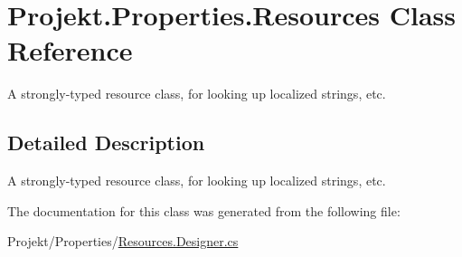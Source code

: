 \hypertarget{class_projekt_1_1_properties_1_1_resources}{}\section{Projekt.\+Properties.\+Resources Class Reference}
\label{class_projekt_1_1_properties_1_1_resources}


A strongly-\/typed resource class, for looking up localized strings, etc.  




\subsection{Detailed Description}
A strongly-\/typed resource class, for looking up localized strings, etc. 



The documentation for this class was generated from the following file\+:\begin{DoxyCompactItemize}
\item 
Projekt/\+Properties/\mbox{\hyperlink{_resources_8_designer_8cs}{Resources.\+Designer.\+cs}}\end{DoxyCompactItemize}
